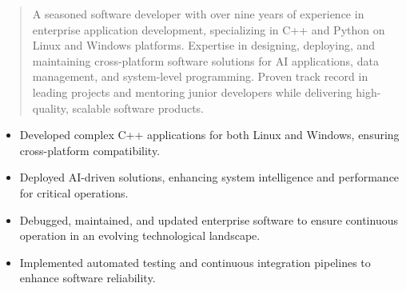 



\makecvheader

\begin{quote}
  \noindent
  A seasoned software developer with over nine years of experience in enterprise application development, specializing in C++ and Python on Linux and Windows platforms. Expertise in designing, deploying, and maintaining cross-platform software solutions for AI applications, data management, and system-level programming. Proven track record in leading projects and mentoring junior developers while delivering high-quality, scalable software products.
\end{quote}

\par\smallskip
\noindent
\begin{minipage}{20cm}
  \begin{minipage}{9.75cm}
    \begin{itemize}
      \item Developed complex C++ applications for both Linux and Windows, ensuring cross-platform compatibility.
      \item Deployed AI-driven solutions, enhancing system intelligence and performance for critical operations.
    \end{itemize}
  \end{minipage}
  \hfill
  \begin{minipage}{9.75cm}
    \begin{itemize}
      \item Debugged, maintained, and updated enterprise software to ensure continuous operation in an evolving technological landscape.
      \item Implemented automated testing and continuous integration pipelines to enhance software reliability.
    \end{itemize}
  \end{minipage}
\end{minipage}
\par\smallskip
\divider


